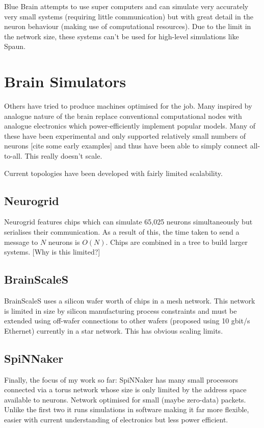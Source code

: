 Blue Brain attempts to use super computers and can simulate very accurately very
small systems (requiring little communication) but with great detail in the
neuron behaviour (making use of computational resources). Due to the limit in
the network size, these systems can't be used for high-level simulations like
Spaun.

\section{Brain Simulators}

Others have tried to produce machines optimised for the job. Many inspired by
analogue nature of the brain replace conventional computational nodes with
analogue electronics which power-efficiently implement popular models. Many of
these have been experimental and only supported relatively small numbers of
neurons [cite some early examples] and thus have been able to simply connect
all-to-all. This really doesn't scale.

Current topologies have been developed with fairly limited scalability.

\subsection{Neurogrid}

Neurogrid features chips which can simulate 65,025 neurons simultaneously but
serialises their communication. As a result of this, the time taken to send a
message to $N$ neurons is $O(N)$. Chips are combined in a tree to build larger
systems. [Why is this limited?]

\subsection{BrainScaleS}

BrainScaleS uses a silicon wafer worth of chips in a mesh network. This network
is limited in size by silicon manufacturing process constraints and must be
extended using off-wafer connections to other wafers (proposed using 10 gbit/s
Ethernet) currently in a star network. This has obvious scaling limits.

\subsection{SpiNNaker}

Finally, the focus of my work so far: SpiNNaker has many small processors
connected via a torus network whose size is only limited by the address space
available to neurons. Network optimised for small (maybe zero-data) packets.
Unlike the first two it runs simulations in software making it far more
flexible, easier with current understanding of electronics but less power
efficient.

